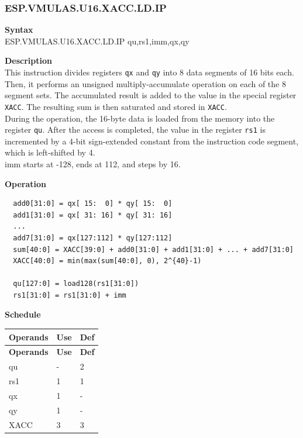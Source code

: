 \newpage
\subsubsection{ESP.VMULAS.U16.XACC.LD.IP}\label{instruction:ESPVMULASU16XACCLDIP}
\textbf{Syntax}\\
ESP.VMULAS.U16.XACC.LD.IP qu,rs1,imm,qx,qy

\textbf{Description}\\
This instruction divides registers \lstinline{qx} and \lstinline{qy} into 8 data segments of 16 bits each. Then, it performs an unsigned multiply-accumulate operation on each of the 8 segment sets. The accumulated result is added to the value in the special register \lstinline{XACC}. The resulting sum is then saturated and stored in \lstinline{XACC}. \\ During the operation, the 16-byte data is loaded from the memory into the register \lstinline{qu}. After the access is completed, the value in the register \lstinline{rs1} is incremented by a 4-bit sign-extended constant from the instruction code segment, which is left-shifted by 4.\\

imm starts at -128, ends at 112, and steps by 16.

\textbf{Operation}
\begin{lstlisting}
  add0[31:0] = qx[ 15:  0] * qy[ 15:  0]
  add1[31:0] = qx[ 31: 16] * qy[ 31: 16]
  ...
  add7[31:0] = qx[127:112] * qy[127:112]
  sum[40:0] = XACC[39:0] + add0[31:0] + add1[31:0] + ... + add7[31:0]
  XACC[40:0] = min(max(sum[40:0], 0), 2^{40}-1)

  qu[127:0] = load128(rs1[31:0])
  rs1[31:0] = rs1[31:0] + imm
\end{lstlisting}

\textbf{Schedule}\\
\begin{longtable}[c]{|l|l|l|}
    \hline
    \rowcolor{lightgray}
    \textbf{Operands} & \textbf{Use} & \textbf{Def} \\\hline
    \endfirsthead
    \hline
    \rowcolor{lightgray}
     \textbf{Operands} & \textbf{Use} & \textbf{Def} \\\hline
    \endhead
    \hline
    \endfoot

    qu & - & 2 \\\hline
    rs1 & 1 & 1 \\\hline
     qx & 1 & - \\\hline
     qy & 1 & - \\\hline
     XACC & 3 & 3

\end{longtable}

